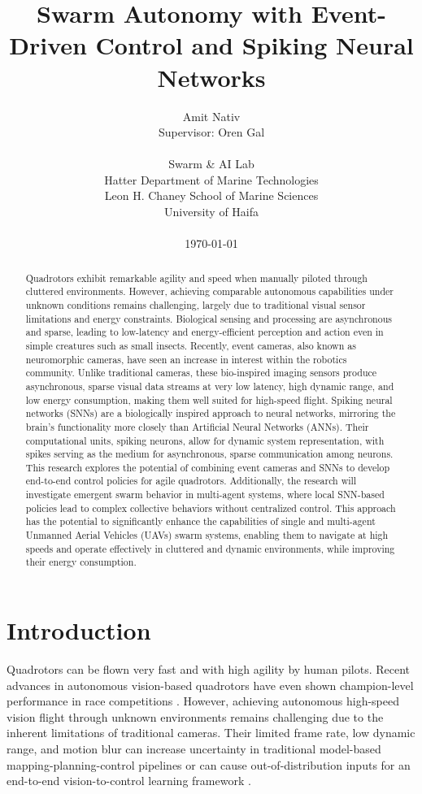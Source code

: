 \documentclass{article}
\title{Swarm Autonomy with Event-Driven Control and Spiking Neural Networks}
\author{
    Amit Nativ \\ 
    Supervisor: Oren Gal \\
    \\
    Swarm \& AI Lab \\
    Hatter Department of Marine Technologies \\
    Leon H. Chaney School of Marine Sciences \\
    University of Haifa \\
    \\
    \today
}
\begin{document}
\maketitle

\begin{abstract}
    Quadrotors exhibit remarkable agility and speed when manually piloted through cluttered environments. However, achieving comparable autonomous capabilities under unknown conditions remains challenging, largely due to traditional visual sensor limitations and energy constraints. Biological sensing and processing are asynchronous and sparse, leading to low-latency and energy-efficient perception and action even in simple creatures such as small insects. Recently, event cameras, also known as neuromorphic cameras, have seen an increase in interest within the robotics community. Unlike traditional cameras, these bio-inspired imaging sensors produce asynchronous, sparse visual data streams at very low latency, high dynamic range, and low energy consumption, making them well suited for high-speed flight. Spiking neural networks (SNNs) are a biologically inspired approach to neural networks, mirroring the brain's functionality more closely than Artificial Neural Networks (ANNs). Their computational units, spiking neurons, allow for dynamic system representation, with spikes serving as the medium for asynchronous, sparse communication among neurons. This research explores the potential of combining event cameras and SNNs to develop end-to-end control policies for agile quadrotors. Additionally, the research will investigate emergent swarm behavior in multi-agent systems, where local SNN-based policies lead to complex collective behaviors without centralized control. This approach has the potential to significantly enhance the capabilities of single and multi-agent Unmanned Aerial Vehicles (UAVs) swarm systems, enabling them to navigate at high speeds and operate effectively in cluttered and dynamic environments, while improving their energy consumption. 
\end{abstract}

\section{Introduction}
Quadrotors can be flown very fast and with high agility by human pilots. Recent advances in autonomous vision-based quadrotors have even shown champion-level performance in race competitions \cite{kaufmannChampionlevelDroneRacing2023, romeroDreamFlyModelBased2025a, loquercioLearningHighSpeedFlight2021}. However, achieving autonomous high-speed vision flight through unknown environments remains challenging due to the inherent limitations of traditional cameras. Their limited frame rate, low dynamic range, and motion blur can increase uncertainty in traditional model-based mapping-planning-control pipelines or can cause out-of-distribution inputs for an end-to-end vision-to-control learning framework \cite{bhattacharyaVisionTransformersEndtoEnd2025}. 
\end{document}
